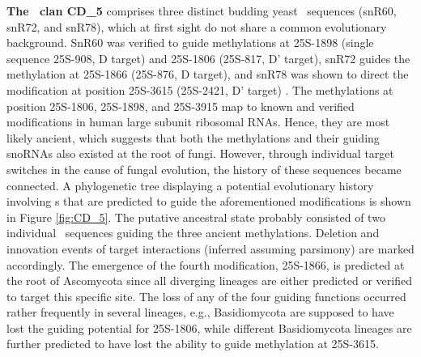 \textbf{The \sno\ clan CD\_5} comprises three distinct budding yeast \sno\
sequences (snR60, snR72, and snR78), which at first sight do not share a
common evolutionary background. SnR60 was verified to guide methylations at
25S-1898 (single sequence 25S-908, D target) and 25S-1806 (25S-817, D'
target), snR72 guides the methylation at 25S-1866 (25S-876, D target), and
snR78 was shown to direct the modification at position 25S-3615 (25S-2421,
D' target) \cite{Lowe:1999}. The methylations at position 25S-1806,
25S-1898, and 25S-3915 map to known and verified modifications in human
large subunit ribosomal RNAs. Hence, they are most likely ancient,
which suggests that both the methylations and their guiding
snoRNAs also existed at the root of fungi.  However, through
individual target switches in the cause of fungal evolution, the history of
these sequences became connected. A phylogenetic tree displaying a
potential evolutionary history involving \sno s that are predicted to guide
the aforementioned modifications is shown in Figure \ref{fig:CD_5}. The
putative ancestral state probably consisted of two individual
\sno\ sequences guiding the three ancient methylations. Deletion and
innovation events of target interactions (inferred assuming
  parsimony) are marked accordingly. The emergence of the fourth
modification, 25S-1866, is predicted at the root of Ascomycota since all
diverging lineages are either predicted or verified to target this specific
site. The loss of any of the four guiding functions occurred rather
frequently in several lineages, e.g., Basidiomycota are supposed to have
lost the guiding potential for 25S-1806, while different Basidiomycota
lineages are further predicted to have lost the ability to guide
methylation at 25S-3615.


